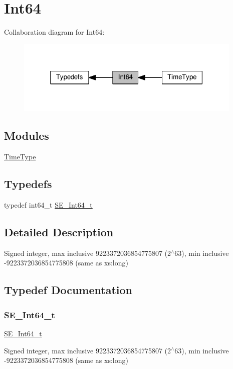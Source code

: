 \hypertarget{group__Int64}{}\section{Int64}
\label{group__Int64}
Collaboration diagram for Int64\+:\nopagebreak
\begin{figure}[H]
\begin{center}
\leavevmode
\includegraphics[width=307pt]{group__Int64}
\end{center}
\end{figure}
\subsection*{Modules}
\begin{DoxyCompactItemize}
\item 
\hyperlink{group__TimeType}{Time\+Type}
\end{DoxyCompactItemize}
\subsection*{Typedefs}
\begin{DoxyCompactItemize}
\item 
typedef int64\+\_\+t \hyperlink{group__Int64_ga946a01895d7edbdd190770677f54f2c6}{S\+E\+\_\+\+Int64\+\_\+t}
\end{DoxyCompactItemize}


\subsection{Detailed Description}
Signed integer, max inclusive 9223372036854775807 (2$^\wedge$63), min inclusive -\/9223372036854775808 (same as xs\+:long) 

\subsection{Typedef Documentation}
\mbox{\label{group__Int64_ga946a01895d7edbdd190770677f54f2c6}} 
\subsubsection{\texorpdfstring{S\+E\+\_\+\+Int64\+\_\+t}{SE\_Int64\_t}}
{\footnotesize\ttfamily \hyperlink{group__Int64_ga946a01895d7edbdd190770677f54f2c6}{S\+E\+\_\+\+Int64\+\_\+t}}

Signed integer, max inclusive 9223372036854775807 (2$^\wedge$63), min inclusive -\/9223372036854775808 (same as xs\+:long) 